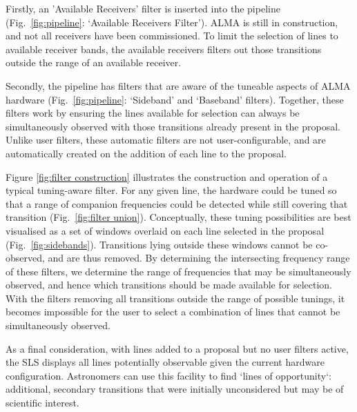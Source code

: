 Firstly, an 'Available Receivers' filter is inserted into the pipeline  (Fig.~\ref{fig:pipeline}: `Available Receivers Filter'). ALMA is still in construction, and not all receivers have been commissioned. To limit the selection of lines to available receiver bands, the available receivers filters out those transitions outside the range of an available receiver. 

Secondly, the pipeline has filters that are aware of the tuneable aspects of ALMA hardware (Fig.~\ref{fig:pipeline}: `Sideband' and `Baseband' filters). Together, these filters work by ensuring the lines available for selection can always be simultaneously observed with those transitions already present in the proposal. Unlike user filters, these automatic filters are not user-configurable, and are automatically created on the addition of each line to the proposal. 

Figure \ref{fig:filter construction} illustrates the construction and operation of a typical tuning-aware filter. For any given line, the hardware could be tuned so that a range of companion frequencies could be detected while still covering that transition (Fig.~\ref{fig:filter union}). Conceptually, these tuning possibilities are best visualised as a set of windows overlaid on each line selected in the proposal (Fig.~\ref{fig:sidebands}). Transitions lying outside these windows cannot be co-observed, and are thus removed. By determining the intersecting frequency range of these filters, we determine the range of frequencies that may be simultaneously observed, and hence which transitions should be made available for selection. With the filters removing all transitions outside the range of possible tunings, it becomes impossible for the user to select a combination of lines that cannot be simultaneously observed.

As a final consideration, with lines added to a proposal but no user filters active, the SLS displays all lines potentially observable given the current hardware configuration. Astronomers can use this facility to find `lines of opportunity`: additional, secondary transitions that were initially unconsidered but may be of scientific interest.

